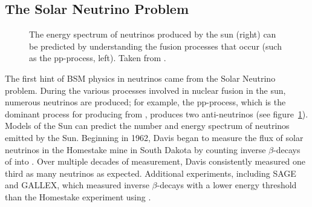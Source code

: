 \documentclass[/main.tex]{subfiles}
\begin{document}
\subsection{The Solar Neutrino Problem}
\begin{figure}[t]
  \centering
  \caption[Neutrinos produced by Solar fusion]{\label{fig:ppproc}
    The energy spectrum of neutrinos produced by the sun (right) can be predicted by understanding the fusion processes that occur (such as the pp-process, left). Taken from \cite{PDG2018}.
  }
\end{figure}
The first hint of BSM physics in neutrinos came from the Solar Neutrino problem.
During the various processes involved in nuclear fusion in the sun, numerous neutrinos are produced; for example, the pp-process, which is the dominant process for producing  from , produces two anti-neutrinos (see figure~\ref{fig:ppproc}).
Models of the Sun can predict the number and energy spectrum of neutrinos emitted by the Sun\cite{Bahcall2005}.
Beginning in 1962, Davis began to measure the flux of solar neutrinos in the Homestake mine in South Dakota by counting inverse $\beta$-decays of  into .
Over multiple decades of measurement, Davis consistently measured one third as many neutrinos as expected\cite{Cleveland1998}.
Additional experiments, including SAGE and GALLEX, which measured inverse $\beta$-decays with a lower energy threshold than the Homestake experiment using \cite{SageGallex1999}.
\end{document}
